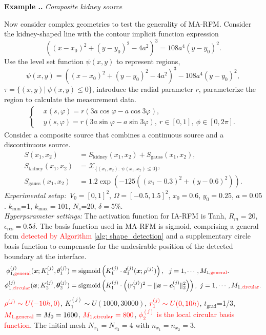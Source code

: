 \documentclass{article}
\newcommand{\red}[1]{\textcolor{red}{#1}}
\theoremstyle{plain}
\theoremstyle{definition}
\newcounter{example}[section]         %
\renewcommand{\theexample}{\thesection.\arabic{example}}
\newenvironment{example}[1][]{
    \refstepcounter{example}%
    \par\noindent\textbf{Example \theexample.} #1 \par
}{\par}
\begin{document}
{\begin{example}[\emph{Composite kidney source}]\label{ex:Composite kidney source}Now consider complex geometries to test the generality of MA-RFM.
Consider the kidney-shaped line with the contour implicit function expression
\begin{equation}
    \label{hidden_function}
    ((x-x_0)^2+(y-y_0)^2-4a^2)^3=108a^4 (y-y_0)^2.
\end{equation}
Use the level set function $\psi(x, y)$ to represent regions,
$$
\psi(x, y)=((x-x_0)^2+(y-y_0)^2-4a^2)^3-108a^4 (y-y_0)^2,
$$
$\tau=\{(x,y)|\ \psi(x,y)\le0\}$,  introduce the radial parameter $r$,  parameterize the region to calculate the measurement data.
\begin{align}\label{para_area}
\left \{
\begin{aligned}
&x(s, \varphi)=r(3a \cos\varphi-a \cos 3\varphi),  \\
&y(s, \varphi)=r(3a \sin\varphi-a \sin 3\varphi),  \ r\in [0, 1],  \ \phi\in[0, 2\pi].
\end{aligned}
\right.
\end{align}
Consider a composite source that combines a continuous source and a discontinuous source.
\begin{align*}
S(x_1, x_2)&=S_{\text{kidney}}(x_1, x_2)+S_{\text{gauss}}(x_1, x_2),  \\
S_{\text{kidney}}(x_1, x_2)&=\mathcal{X}_{\{(x_1, x_2):\  \psi(x_1, x_2)\le0\}},  \\
S_{\text{gauss}}(x_1, x_2)&=1.2 \exp(-125((x_1-0.3)^2+(y-0.6)^2)).
\end{align*}
\noindent \emph{Experimental setup:}\ $V_0=[0, 1]^2$,   $\Omega=[-0.5, 1.5]^2$,  $x_0=0.6$,  $y_0=0.25$,  $a=0.05$. $k_{\text{min}}$=1,  $k_{\text{max}}=101$, $N_s$=20,  $\delta=5\%$.\\
\noindent \emph{Hyperparameter settings:}
The activation function for IA-RFM is Tanh, $R_m=20$,  $\epsilon_{\text{res}}=0.5\delta$. The basis function used in MA-RFM is sigmoid, comprising a general form \red{detected by Algorithm \ref{alg: shape_detection}} and a supplementary circle basis function to compensate for the undesirable position of the detected boundary at the interface. 
    \begin{align*}
        \phi_{1,\red{\text{general}}}^{(j)}(\boldsymbol{x};K_1^{(j)},\theta^{(j)}_1) &= \text{sigmoid} \left(K_1^{(j)} \cdot d_1^{(j)}(\boldsymbol{x};\rho^{(j)}) \right),  \ \ j=1, \cdots, M_{1,\red{\text{general}}}. \\
        \phi_{1,\text{\red{circular}}}^{(j)}(\boldsymbol{x};K_2^{(j)},\boldsymbol{\theta}_2^{(j)})&=\text{sigmoid}\left(K_1^{(j)}\cdot\left((r_1^{(j)})^2-\|\boldsymbol{x}-\boldsymbol{c}_{1}^{(j)}\|_2^2\right)\right), \ j=1, \cdots, M_{1,\red{\text{circular}}}.
    \end{align*}
$\red{\rho^{(j)} \sim U(-10h, 0)}$, $K_1^{(j)} \sim U(1000,30000)$, $\red{r_1^{(j)} \sim U(0, 10h)}$, $t_{\text{grad}}$=1/3,    $\red{M_{1,\text{general}}}=M_0=1600$,  $\red{M_{1,\text{circular}}=800}$, \red{$\phi_2^{(j)}$ is the local circular basis function}. The initial mesh $N_{x_1}=N_{x_2}=4$ with $n_{x_1}=n_{x_2}=3$. \\


\end{example}}
\end{document}
